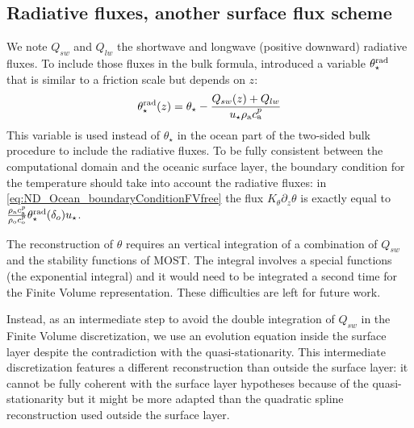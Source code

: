 \subsection{Radiative fluxes, another surface flux scheme}
\label{sec:ND_Ocean_radiativeFluxes}
We note $Q_{sw}$ and $Q_{lw}$ the shortwave and longwave (positive
downward) radiative fluxes.
To include those fluxes in the
bulk formula, \citep{pelletier_two-sided_2021} introduced
a variable $\theta_\star^{\rm rad}$
that is similar to a friction scale but depends on $z$:
\begin{equation}
\theta_\star^{\rm rad}(z) =
	\theta_\star -
	\frac{Q_{sw}(z) + Q_{lw}}{u_{\star}\rho_{\rm a} c_{\rm a}^p}
\end{equation}
This variable is used instead of $\theta_\star$
in the ocean part of the two-sided bulk procedure
to include the radiative fluxes.
To be fully consistent between the computational domain and
the oceanic surface layer, the boundary condition for the temperature
should take into account the radiative fluxes: in
\eqref{eq:ND_Ocean_boundaryConditionFVfree} the flux
$K_\theta \partial_z \theta$ is exactly equal to
$\frac{\rho_{\rm a} c_{\rm a}^p}{\rho_{\rm o} c_{\rm o}^p}
\theta_\star^{\rm rad}(\delta_o) u_\star$.
\par
The reconstruction of $\theta$
requires an vertical integration of a combination of $Q_{sw}$
and the stability functions of MOST. The integral involves
a special functions (the exponential integral)
and it would need to be integrated a second time
for the Finite Volume representation. These difficulties
are left for future work.
\par
Instead, as an intermediate step
to avoid the double integration of $Q_{sw}$
in the Finite Volume discretization,
we use an evolution equation
inside the surface layer despite the contradiction with
the quasi-stationarity. This intermediate discretization
features a different reconstruction than outside the
surface layer:
it cannot be fully coherent with the surface layer
hypotheses because of the quasi-stationarity
but it might be more adapted than the
quadratic spline reconstruction used outside the surface layer.
